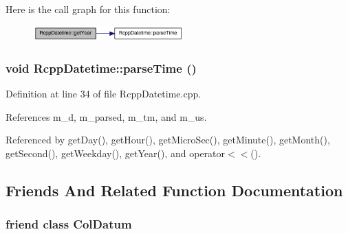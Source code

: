 Here is the call graph for this function:\nopagebreak
\begin{figure}[H]
\begin{center}
\leavevmode
\includegraphics[width=164pt]{classRcppDatetime_aba930a8d7d575eb10444258a442027cf_cgraph}
\end{center}
\end{figure}
\hypertarget{classRcppDatetime_aa4b2eba45c4c02b5d334dd89e080b660}{
\subsubsection[{parseTime}]{\setlength{\rightskip}{0pt plus 5cm}void RcppDatetime::parseTime ()}}
\label{classRcppDatetime_aa4b2eba45c4c02b5d334dd89e080b660}


Definition at line 34 of file RcppDatetime.cpp.

References m\_\-d, m\_\-parsed, m\_\-tm, and m\_\-us.

Referenced by getDay(), getHour(), getMicroSec(), getMinute(), getMonth(), getSecond(), getWeekday(), getYear(), and operator$<$$<$().

\subsection{Friends And Related Function Documentation}
\hypertarget{classRcppDatetime_a2740dcf7de2c2f5471d8fa18944a98d7}{
\subsubsection[{ColDatum}]{\setlength{\rightskip}{0pt plus 5cm}friend class {\bf ColDatum}}}
\label{classRcppDatetime_a2740dcf7de2c2f5471d8fa18944a98d7}


